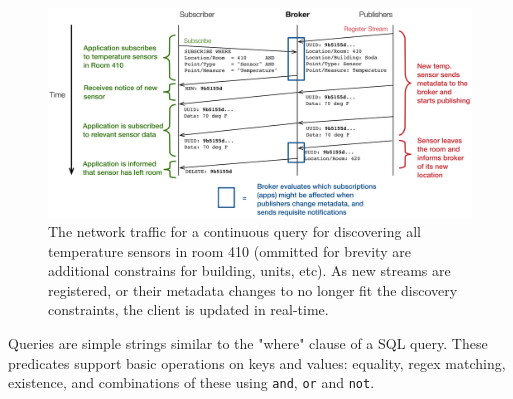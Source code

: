 
\begin{figure}[t]
\centering
\includegraphics[width=.8\linewidth]{figs/messages.pdf}
\caption{The network traffic for a continuous query for discovering all temperature sensors in room 410 (ommitted
for brevity are additional constrains for building, units, etc). As new streams are registered, or their metadata
changes to no longer fit the discovery constraints, the client is updated in real-time.}
\label{fig:messages}
\end{figure}


Queries are simple strings similar to the "where" clause of a SQL query. 
These predicates support basic operations on keys and values: equality, regex matching, existence, and combinations of these using \texttt{and}, \texttt{or} and \texttt{not}.

